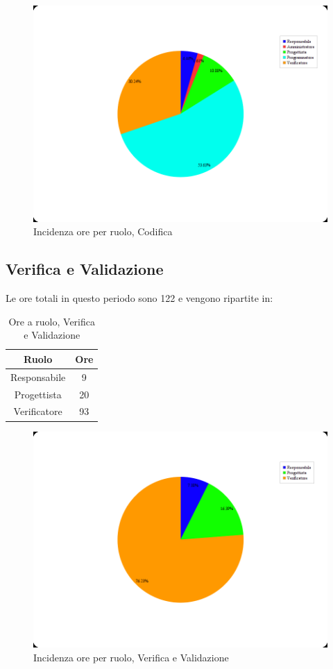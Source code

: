 \begin{figure}[H]
	\centering
	\includegraphics[scale=0.3]{immagini/Grafi/OreRuoloCod}
	\caption{Incidenza ore per ruolo, Codifica}
\end{figure}

\subsection{Verifica e Validazione}
Le ore totali in questo periodo sono 122 e vengono ripartite in:
\begin{table}[H]
	\begin{center}
		\begin{tabular}{|c|c|}
			\hline
			\textbf{Ruolo}	& \textbf{Ore} \\
			\hline
			Responsabile	&	9	\\
			\hline
			Progettista		&	20	\\
			\hline
			Verificatore	&	93	\\
			\hline
		\end{tabular}
	\end{center}
	\caption{Ore a ruolo, Verifica e Validazione}
\end{table}

\begin{figure}[H]
	\centering
	\includegraphics[scale=0.3]{immagini/Grafi/OreRuoloVerifica}
	\caption{Incidenza ore per ruolo, Verifica e Validazione}
\end{figure}

